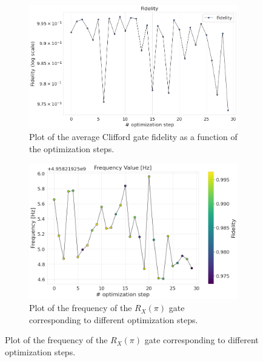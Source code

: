 \begin{figure}[h]
    \centering
    \begin{subfigure}[t]{0.495\textwidth}
        \includegraphics[width=\textwidth]{figures/png/RB_optimization/CMA/fidelity.png}
        \caption{Plot of the average Clifford gate fidelity as a function of the optimization steps.}
        \label{fig:CMA:fidelity}
    \end{subfigure}
    \hfill
    \begin{subfigure}[t]{0.495\textwidth}
        \includegraphics[width=\textwidth]{figures/png/RB_optimization/CMA/CMA_frequency.png}
        \caption{Plot of the frequency of the $R_X(\pi)$ gate corresponding to different optimization steps.}
        \label{fig:CMA:frequency}
    \end{subfigure}

    \vspace{0.5cm}


\end{figure}
